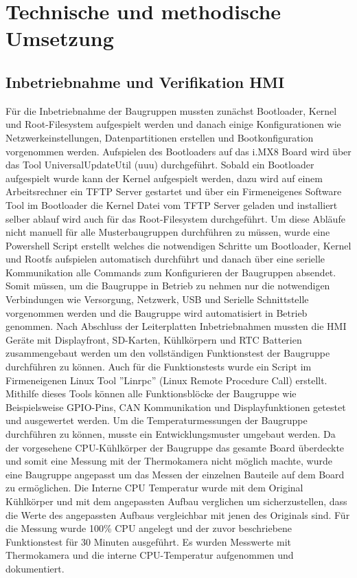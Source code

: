 \documentclass[praktikum,german]{hgbthesis}
\begin{document}
\chapter{Technische und methodische Umsetzung}


\section{Inbetriebnahme und Verifikation HMI}
Für die Inbetriebnahme der Baugruppen mussten zunächst Bootloader, Kernel und Root-Filesystem aufgespielt werden und danach einige Konfigurationen wie Netzwerkeinstellungen, Datenpartitionen erstellen und Bootkonfiguration vorgenommen werden. Aufspielen des Bootloaders auf das i.MX8 Board wird über das Tool UniversalUpdateUtil (uuu) durchgeführt. Sobald ein Bootloader aufgespielt wurde kann der Kernel aufgespielt werden, dazu wird auf einem Arbeitsrechner ein TFTP Server gestartet und über ein Firmeneigenes Software Tool im Bootloader die Kernel Datei vom TFTP Server geladen und installiert selber ablauf wird auch für das Root-Filesystem durchgeführt. Um diese Abläufe nicht manuell für alle Musterbaugruppen durchführen zu müssen, wurde eine Powershell Script erstellt welches die notwendigen Schritte um Bootloader, Kernel und Rootfs aufspielen automatisch durchführt und danach über eine serielle Kommunikation alle Commands zum Konfigurieren der Baugruppen absendet. Somit müssen, um die Baugruppe in Betrieb zu nehmen nur die notwendigen Verbindungen wie Versorgung, Netzwerk, USB und Serielle Schnittstelle vorgenommen werden und die Baugruppe wird automatisiert in Betrieb genommen. Nach Abschluss der Leiterplatten Inbetriebnahmen mussten die HMI Geräte mit Displayfront, SD-Karten, Kühlkörpern und RTC Batterien zusammengebaut werden um den vollständigen Funktionstest der Baugruppe durchführen zu können. Auch für die Funktionstests wurde ein Script im Firmeneigenen Linux Tool ''Linrpc'' (Linux Remote Procedure Call) erstellt. Mithilfe dieses Tools können alle Funktionsblöcke der Baugruppe wie Beispielsweise GPIO-Pins, CAN Kommunikation und Displayfunktionen getestet und ausgewertet werden. 
Um die Temperaturmessungen der Baugruppe durchführen zu können, musste ein Entwicklungsmuster umgebaut werden. Da der vorgesehene CPU-Kühlkörper der Baugruppe das gesamte Board überdeckte und somit eine Messung mit der Thermokamera nicht möglich machte, wurde eine Baugruppe angepasst um das Messen der einzelnen Bauteile auf dem Board zu ermöglichen. Die Interne CPU Temperatur wurde mit dem Original Kühlkörper und mit dem angepassten Aufbau verglichen um sicherzustellen, dass die Werte des angepassten Aufbaus vergleichbar mit jenen des Originals sind. Für die Messung wurde 100\% CPU angelegt und der zuvor beschriebene Funktionstest für 30 Minuten ausgeführt. Es wurden Messwerte mit Thermokamera und die interne CPU-Temperatur aufgenommen und dokumentiert.
\end{document}
